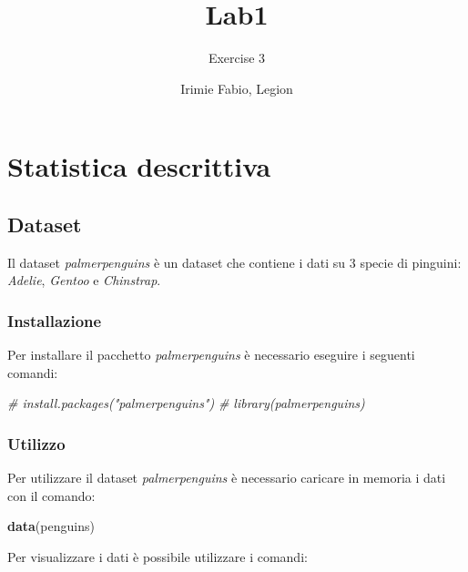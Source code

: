 \documentclass[
]{article}
\title{Lab1}
\subtitle{Exercise 3}
\author{Irimie Fabio, Legion}
\date{}
\newenvironment{Shaded}{\begin{snugshade}}{\end{snugshade}}
\newcommand{\CommentTok}[1]{\textcolor[rgb]{0.56,0.35,0.01}{\textit{#1}}}
\newcommand{\FunctionTok}[1]{\textcolor[rgb]{0.13,0.29,0.53}{\textbf{#1}}}
\newcommand{\NormalTok}[1]{#1}
\begin{document}
\maketitle

{
\setcounter{tocdepth}{2}
\tableofcontents
}
\hypertarget{statistica-descrittiva}{%
\section{Statistica descrittiva}\label{statistica-descrittiva}}

\hypertarget{dataset}{%
\subsection{Dataset}\label{dataset}}

Il dataset \emph{palmerpenguins} è un dataset che contiene i dati su 3
specie di pinguini: \emph{Adelie}, \emph{Gentoo} e \emph{Chinstrap}.

\hypertarget{installazione}{%
\subsubsection{Installazione}\label{installazione}}

Per installare il pacchetto \emph{palmerpenguins} è necessario eseguire
i seguenti comandi:

\begin{Shaded}
\begin{Highlighting}[]
\CommentTok{\# install.packages("palmerpenguins")}
\CommentTok{\# library(palmerpenguins)}
\end{Highlighting}
\end{Shaded}

\hypertarget{utilizzo}{%
\subsubsection{Utilizzo}\label{utilizzo}}

Per utilizzare il dataset \emph{palmerpenguins} è necessario caricare in
memoria i dati con il comando:

\begin{Shaded}
\begin{Highlighting}[]
\FunctionTok{data}\NormalTok{(penguins)}
\end{Highlighting}
\end{Shaded}

Per visualizzare i dati è possibile utilizzare i comandi:
\end{document}
